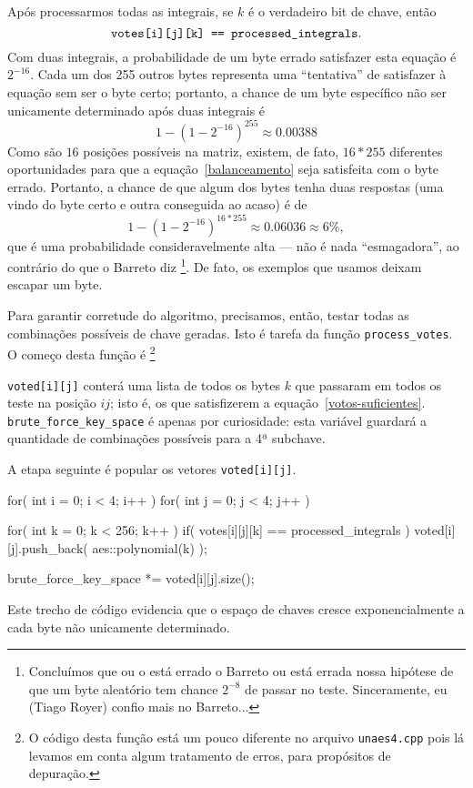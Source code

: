 \documentclass{article}
\begin{document}
Após processarmos todas as integrais,
se $k$ é o verdadeiro bit de chave,
então
\begin{equation}
    \label{votos-suficientes}
    \verb"votes[i][j][k] == processed_integrals".
\end{equation}
Com duas integrais,
a probabilidade de um byte errado satisfazer esta equação
é $2^{-16}$.
Cada um dos 255 outros bytes representa uma ``tentativa''
de satisfazer à equação sem ser o byte certo;
portanto,
a chance de um byte específico não ser unicamente determinado
após duas integrais é
\begin{equation*}
    1 - (1 - 2^{-16})^{255} \approx 0.00388
\end{equation*}
Como são $16$ posições possíveis na matriz,
existem, de fato, $16*255$ diferentes oportunidades
para que a equação~\ref{balanceamento} seja satisfeita com o byte errado.
Portanto,
a chance de que algum dos bytes tenha duas respostas
(uma vindo do byte certo e outra conseguida ao acaso)
é de
\begin{equation*}
    1 - (1 - 2^{-16})^{16*255} \approx 0.06036 \approx 6\%,
\end{equation*}
que é uma probabilidade consideravelmente alta
--- não é nada ``esmagadora'', ao contrário do que o Barreto diz%
\footnote{
    Concluímos que ou o está errado o Barreto
    ou está errada nossa hipótese de que
    um byte aleatório tem chance $2^{-8}$ de passar no teste.
    Sinceramente, eu (Tiago Royer) confio mais no Barreto...
}.
De fato, os exemplos que usamos deixam escapar um byte.

Para garantir corretude do algoritmo,
precisamos, então, testar todas as combinações possíveis de chave geradas.
Isto é tarefa da função \verb"process_votes".
O começo desta função é%
\footnote{
    O código desta função está um pouco diferente no arquivo \texttt{unaes4.cpp}
    pois lá levamos em conta algum tratamento de erros,
    para propósitos de depuração.
}
\begin{cppcode}
    void process_votes() {
        std::vector<aes::polynomial> voted[4][4];
        int brute_force_key_space = 1;
\end{cppcode}
\verb"voted[i][j]" conterá uma lista de todos os bytes $k$
que passaram em todos os teste na posição $ij$;
isto é, os que satisfizerem a equação~\ref{votos-suficientes}.
\verb"brute_force_key_space" é apenas por curiosidade:
esta variável guardará a quantidade de combinações possíveis para a 4ª subchave.

A etapa seguinte é popular os vetores \verb"voted[i][j]".
\begin{cppcode}
        for( int i = 0; i < 4; i++ )
        for( int j = 0; j < 4; j++ ) {
            for( int k = 0; k < 256; k++ )
                if( votes[i][j][k] == processed_integrals )
                    voted[i][j].push_back( aes::polynomial(k) );

            brute_force_key_space *= voted[i][j].size();
        }
\end{cppcode}
Este trecho de código evidencia que o espaço de chaves
cresce exponencialmente a cada byte não unicamente determinado.
\end{document}
